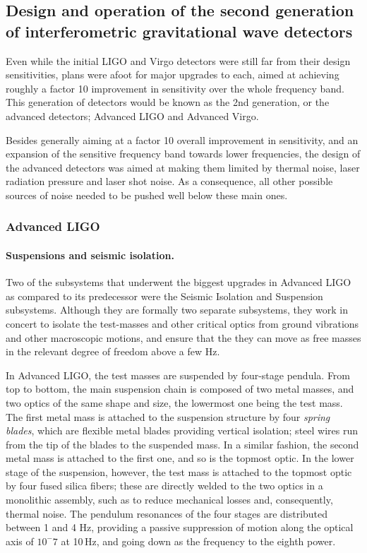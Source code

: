 \subsection{Design and operation of the second generation of interferometric gravitational wave detectors}\label{subsec:2ndgen}

Even while the initial LIGO and Virgo detectors were still far from their design sensitivities, plans were afoot for major 
upgrades to each, aimed at achieving roughly a factor 10 improvement in sensitivity over the whole frequency band. 
This generation of detectors would be known as the 2nd generation, or the advanced detectors; Advanced LIGO and 
Advanced Virgo. 

Besides generally aiming at a factor 10 overall improvement in sensitivity, and an expansion of the sensitive 
frequency band towards lower frequencies, the design of the advanced detectors was aimed at making them 
limited by thermal noise, laser radiation pressure and laser shot noise. As a consequence, all other possible 
sources of noise needed to be pushed well below these main ones.

\subsubsection{Advanced LIGO}


\paragraph*{Suspensions and seismic isolation.}
Two of the subsystems that underwent the biggest upgrades in Advanced LIGO as compared 
to its predecessor were the Seismic Isolation and Suspension subsystems. Although they 
are formally two separate subsystems, they work in concert to isolate the test-masses and 
other critical optics from ground vibrations and other macroscopic motions, and ensure 
that the they can move as free masses in the relevant degree of freedom above a few Hz.

In Advanced LIGO, the test masses are suspended by four-stage pendula. From top to 
bottom, the main suspension chain is composed of two metal masses, and two optics 
of the same shape and size, the lowermost one being the test mass. The first metal mass 
is attached to the suspension structure by four \textit{spring blades}, which are flexible 
metal blades providing vertical isolation; steel wires run from the tip of the blades to the 
suspended mass. In a similar fashion, the second metal mass is attached to the first one, 
and so is the topmost optic. In the lower stage of the suspension, however, the test mass 
is attached to the topmost optic by four fused silica fibers; these are directly welded to 
the two optics in a monolithic assembly, such as to reduce mechanical losses and, 
consequently, thermal noise. The pendulum resonances of the four stages are 
distributed between 1 and 4 Hz, providing a passive suppression of motion along 
the optical axis of $10^-7$ at 10\,Hz, and going down as the frequency to the eighth power.

